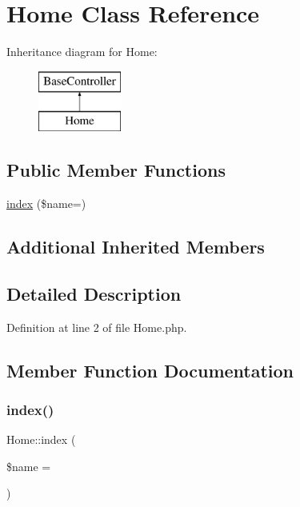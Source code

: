 \hypertarget{class_home}{}\section{Home Class Reference}
\label{class_home}
Inheritance diagram for Home\+:\begin{figure}[H]
\begin{center}
\leavevmode
\includegraphics[height=2.000000cm]{class_home}
\end{center}
\end{figure}
\subsection*{Public Member Functions}
\begin{DoxyCompactItemize}
\item 
\hyperlink{class_home_a94a959c81a99ca7f13a5ed8cd07634b3}{index} (\$name=\textquotesingle{}\textquotesingle{})
\end{DoxyCompactItemize}
\subsection*{Additional Inherited Members}


\subsection{Detailed Description}


Definition at line 2 of file Home.\+php.



\subsection{Member Function Documentation}
\hypertarget{class_home_a94a959c81a99ca7f13a5ed8cd07634b3}{}\label{class_home_a94a959c81a99ca7f13a5ed8cd07634b3} 
\subsubsection{\texorpdfstring{index()}{index()}}
{\footnotesize\ttfamily Home\+::index (\begin{DoxyParamCaption}\item[{}]{\$name = {\ttfamily \textquotesingle{}\textquotesingle{}} }\end{DoxyParamCaption})}



